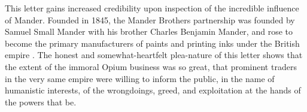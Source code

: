 \documentclass{article}
\begin{document}
This letter gains increased credibility upon inspection of the incredible influence of Mander. Founded in 1845, the Mander Brothers partnership was founded by Samuel Small Mander with his brother Charles Benjamin Mander, and rose to become the primary manufacturers of paints and printing inks under the British empire \autocite{Mander:1955}. The honest and somewhat-heartfelt plea-nature of this letter shows that the extent of the immoral Opium business was so great, that prominent traders in the very same empire were willing to inform the public, in the name of humanistic interests, of the wrongdoings, greed, and exploitation at the hands of the powers that be.


\pagebreak
\printbibliography[title={Cited Works}, heading=bibintoc]
\end{document}

